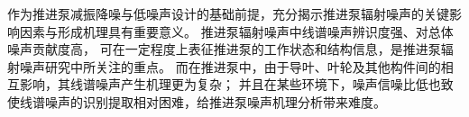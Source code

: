 \cleardoublepage
{}
\begin{comment}
目前船艇推进系统对高效低噪声推进泵的需求日益迫切，
在满足推进性能需求的基础上，
推进泵水下噪声已经成为一项关键技术指标。
为了更好的服务于推进泵低噪声设计，
有必要对推进泵噪声的声纹特征进行研究。
噪声的特征线谱是推进泵噪声研究中所关注的重点，
特征线谱不仅能表征推进泵的工作状态和结构信息，
也是声呐系统追踪和识别的重要信息，
但是其提取面临环境干扰强、直接测量难度大的问题。
因此，本文围绕推进泵噪声的声纹特征展开，针对噪声特征线谱提取的需求，
以紧凑型前置导叶的单级推进泵和新型结构的双级推进泵为研究对象，
设计噪声测试与分析系统并开展试验研究，
研究了推进泵噪声的声纹特征，
基于循环平稳分析方法实现了推进泵噪声的特征线谱提取。
本文主要研究内容包括以下几个方面：

（1）基于LabVIEW开发了推进泵噪声测试与分析系统。
其中涵盖了传感器、数据采集等硬件设计，以及信号分析、显示、存储等软件模块的设计。
该系统支持同步对多通道传感器信号实时采集，各通道信号同时分析、显示及存储，
具有操作简单、经济高效等优势。
基于系统的信号分析模块，可实现对噪声的频段能量分布特点、特征频段总声压量级、频谱特征等声纹特征分析。

（2）以紧凑型前置导叶的单级推进泵和新型结构的双级推进泵为研究对象，
在大型空泡水洞中对其分别开展了噪声试验。
在考虑背景噪声影响的基础上，
研究不同工况下推进泵噪声的声纹特征变化，
以及流速等与噪声的声学关联性。
结果表明，中低频段噪声对推进泵噪声有显著贡献。
噪声中低频段、高频段和全频段的总声压级随着流速的增大而增大，
流速变化对推进泵噪声能量分布和总声压级影响主要体现在中低频段。
两种形式的推进泵噪声频谱均表现为中低频线谱噪声、中低频宽带噪声和高频宽带噪声。

（3）开展了推进泵声信号的特性研究。
结合推进泵声信号产生的机理和声信号特征，对声信号进行了
组分分析。推进泵声信号成分主要包括确定性信号分量、调制信号分量和环境噪声信号分量。
基于推进泵声信号的循环平稳特性和各组分的特点，
对匀速运转工况下的无空化声信号建立了调幅调制信号模型，
采用循环平稳分析方法对声信号的仿真模型进行了研究，
验证了循环平稳解调算法提取多组分调制频率的有效性和良好的抗噪性能。
 
（4）推进泵噪声的特征线谱提取和分析。针对噪声特征线谱提取的需求，
基于循环平稳分析方法实现了推进泵低频线谱的提取。
为了验证循环平稳分析方法提取特征线谱的可行性，采用 CFD 数
值模拟获得了推进泵脉动力特征，
结果表明循环平稳分析方法提取出的低频线谱成分可以和非定常脉动力的特征线谱对应起来。
同时，对推进泵噪声的调制特性进行了研究，
发现推进泵声信号具有强烈的调制特征，其中轴频和动叶叶频为主要的调制频率。
随着流速的增大，动叶叶频的调制贡献度也愈发显著。

\end{comment}
作为推进泵减振降噪与低噪声设计的基础前提，充分揭示推进泵辐射噪声的关键影响因素与形成机理具有重要意义。
推进泵辐射噪声中线谱噪声辨识度强、对总体噪声贡献度高，
可在一定程度上表征推进泵的工作状态和结构信息，是推进泵辐射噪声研究中所关注的重点。
而在推进泵中，由于导叶、叶轮及其他构件间的相互影响，其线谱噪声产生机理更为复杂；
并且在某些环境下，噪声信噪比低也致使线谱噪声的识别提取相对困难，给推进泵噪声机理分析带来难度。

